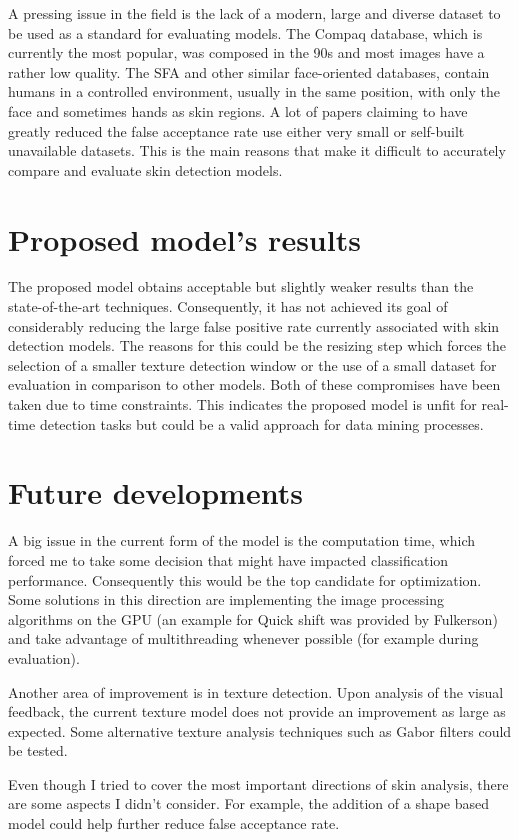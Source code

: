 \documentclass[12pt]{report}
\begin{document}
	A pressing issue in the field is the lack of a modern, large and diverse dataset to be used as a standard for evaluating models. The Compaq database, which is currently the most popular, was composed in the 90s and most images have a rather low quality. The SFA and other similar face-oriented databases, contain humans in a controlled environment, usually in the same position, with only the face and sometimes hands as skin regions. A lot of papers claiming to have greatly reduced the false acceptance rate use either very small or self-built unavailable datasets. This is the main reasons that make it difficult to accurately compare and evaluate skin detection models.
	
	\section{Proposed model's results}
	
	The proposed model obtains acceptable but slightly weaker results than the state-of-the-art techniques. Consequently, it has not achieved its goal of considerably reducing the large false positive rate currently associated with skin detection models. The reasons for this could be the resizing step which forces the selection of a smaller texture detection window or the use of a small dataset for evaluation in comparison to other models. Both of these compromises have been taken due to time constraints. This indicates the proposed model is unfit for real-time detection tasks but could be a valid approach for data mining processes.
	
	\section{Future developments}
	A big issue in the current form of the model is the computation time, which forced me to take some decision that might have impacted classification performance. Consequently this would be the top candidate for optimization. Some solutions in this direction are implementing the image processing algorithms on the GPU (an example for Quick shift was provided by Fulkerson\cite{quickshift_gpu}) and take advantage of multithreading whenever possible (for example during evaluation).
	
	Another area of improvement is in texture detection. Upon analysis of the visual feedback, the current texture model does not provide an improvement as large as expected. Some alternative texture analysis techniques such as Gabor filters could be tested.
	
	Even though I tried to cover the most important directions of skin analysis, there are some aspects I didn't consider. For example, the addition of a shape based model could help further reduce false acceptance rate.
	
	\newpage
	
	
\end{document}
